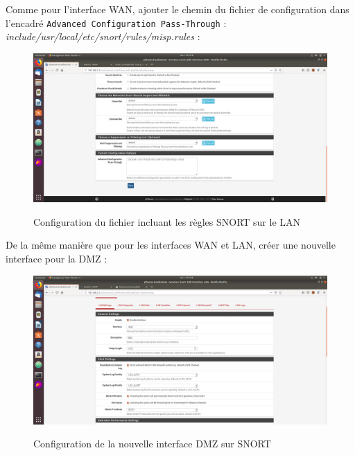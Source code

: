 Comme pour l'interface WAN, ajouter le chemin du fichier de configuration dans l'encadré \texttt{Advanced Configuration Pass-Through} : \textit{include/usr/local/etc/snort/rules/misp.rules} :
\begin{figure}[h!]
    \begin{center}
        \includegraphics[scale=0.31]{MISP_Screenshots/Snort/13.png}
        \label{MISP_Screenshots/Snort/13}
        \caption{Configuration du fichier incluant les règles SNORT sur le LAN}
    \end{center}
\end{figure}
\FloatBarrier

\pagebreak

De la même manière que pour les interfaces WAN et LAN, créer une nouvelle interface pour la DMZ :
\begin{figure}[h!]
    \begin{center}
        \includegraphics[scale=0.31]{MISP_Screenshots/Snort/14.png}
        \label{MISP_Screenshots/Snort/14}
        \caption{Configuration de la nouvelle interface DMZ sur SNORT}
    \end{center}
\end{figure}
\FloatBarrier 

